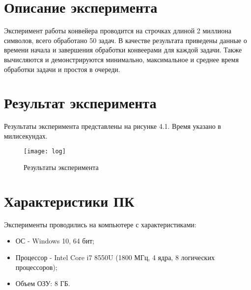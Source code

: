 \section{Описание эксперимента}
Эксперимент работы конвейера проводится на строчках длиной 2 миллиона символов, всего обработано 50 задач. В качестве результата приведены данные о времени начала и завершения обработки конвеерами для каждой задачи. Также вычисляются и демонстрируются минимально, максимальное и среднее время обработки задачи и простоя в очереди.

\section{Результат эксперимента}
Результаты эксперимента представлены на рисунке 4.1. Время указано в милисекундах.

\begin{figure}[h]
	\begin{center}
		{\texttt{[image: log]}}
		\caption{Результаты эксперимента}
	\end{center}
\end{figure}

\section{Характеристики ПК}
Эксперименты проводились на компьютере с характеристиками:
\begin{itemize}
	\item ОС - Windows 10, 64 бит;
	\item Процессор -  Intel Core i7 8550U (1800 МГц, 4 ядра, 8 логических процессоров);
	\item Объем ОЗУ: 8 ГБ.
\end{itemize}

